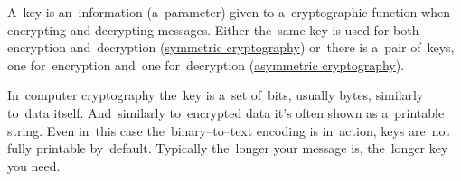 \label{key}
A~key is an~information (a~parameter) given to a~cryptographic function when encrypting and decrypting messages.
Either the~same key is used for both encryption and~decryption (\hyperref[symmetriccryptography]{symmetric cryptography}) or~there is a~pair of~keys, one for~encryption and~one for~decryption (\hyperref[asymmetriccryptography]{asymmetric cryptography}).

In~computer cryptography the~key is a~set of~bits, usually bytes, similarly to~data itself.
And~similarly to~encrypted data it's often shown as a~printable string.
Even in~this case the~binary--to--text encoding is in~action, keys are~not fully printable by~default.
Typically the~longer your message is, the~longer key you need.
